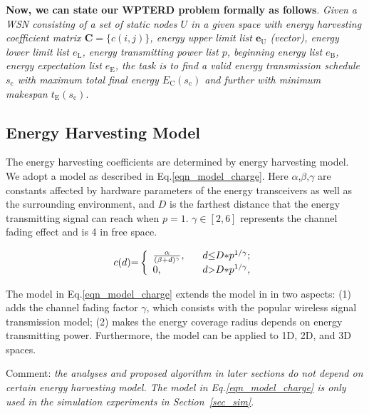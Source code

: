 \documentclass[journal,10pt]{IEEEtran}
\begin{document}
\textbf{Now, we can state our WPTERD problem formally as follows}. \textit{Given a WSN consisting of a set of static nodes $U$ in a given space with energy harvesting coefficient matrix $\mathbf{C}{=}\{c(i,j)\}$, energy upper limit list $\mathbf{e}_\text{U}$ (vector), energy lower limit list $e_\text{L}$, energy transmitting power list $p$, beginning energy list $e_\text{B}$, energy expectation list $e_\text{E}$, the task is to find a valid energy transmission schedule $s_\text{c}$ with maximum total final energy $E_\text{C}(s_\text{c})$ and further with minimum makespan $t_\text{E}(s_\text{c})$}.

\subsection{Energy Harvesting Model}
The energy harvesting coefficients are determined by energy harvesting model. We adopt a model as described in Eq.\eqref{eqn_model_charge}. Here $\alpha$,$\beta$,$\gamma$ are constants affected by hardware parameters of the energy transceivers as well as the surrounding environment, and $D$ is the farthest distance that the energy transmitting signal can reach when $p{=}1$. $\gamma{\in}[2,6]$ represents the channel fading effect and is 4 in free space.

\begin{equation}
\label{eqn_model_charge}
c(d){=}\left\{
\begin{array}{ll}
\frac{\alpha}{(\beta{+}d)^{\gamma}}, \hspace{3mm}&d{\leq}D{*}p^{1/\gamma};\\
0,&d{>}D{*}p^{1/\gamma},
\end{array}
\right.
\end{equation}

The model in Eq.\eqref{eqn_model_charge} extends the model in \cite{Dai2017TON} in two aspects: (1) adds the channel fading factor $\gamma$, which consists with the popular wireless signal transmission model; (2) makes the energy coverage radius depends on energy transmitting power. Furthermore, the model can be applied to 1D, 2D, and 3D spaces.

Comment: \textit{the analyses and proposed algorithm in later sections do not depend on certain energy harvesting model. The model in Eq.\ref{eqn_model_charge} is only used in the simulation experiments in Section~\ref{sec_sim}}.
\end{document}
